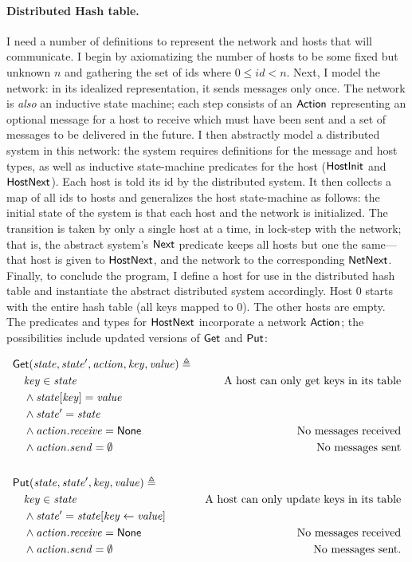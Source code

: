 \paragraph{Distributed Hash table.} I need a number of definitions to represent
the network and hosts that will communicate. I begin by axiomatizing the number
of hosts to be some fixed but unknown \(n\) and gathering the set of ids where
\(0 \le id < n\). Next, I model the network: in its idealized representation, it
sends messages only once. The network is \emph{also} an inductive state machine;
each step consists of an \(\mathsf{Action}\) representing an optional message for
a host to receive which must have been sent and a set of messages to be
delivered in the future. I then abstractly model a distributed system in this
network: the system requires definitions for the message and host types, as well
as inductive state-machine predicates for the host (\(\mathsf{HostInit}\) and
\(\mathsf{HostNext}\)). Each host is told its id by the distributed system. It
then collects a map of all ids to hosts and generalizes the host state-machine
as follows: the initial state of the system is that each host and the network is
initialized. The transition is taken by only a single host at a time, in
lock-step with the network; that is, the abstract system's \(\mathsf{Next}\)
predicate keeps all hosts but one the same---that host is given to
\(\mathsf{HostNext}\), and the network to the corresponding \(\mathsf{NetNext}\).
Finally, to conclude the program, I define a host for use in the distributed
hash table and instantiate the abstract distributed system accordingly. Host 0
starts with the entire hash table (all keys mapped to 0). The other hosts are
empty. The predicates and types for \(\mathsf{HostNext}\) incorporate a network
\(\mathsf{Action}\); the possibilities include updated versions of \(\mathsf{Get}\)
and \(\mathsf{Put}\):

\begin{align*}
    & \mathsf{Get}(\mathit{state}, \mathit{state'}, \mathit{action}, \mathit{key}, \mathit{value}) \triangleq\; \\
    & \quad \mathit{key} \in \mathit{state} & \text{A host can only get keys in its table} \\
    & \quad \land \mathit{state}[\mathit{key}] = \mathit{value} \\
    & \quad \land \mathit{state'} = \mathit{state} \\
    & \quad \land \mathit{action.receive} = \mathsf{None} & \text{No messages received} \\
    & \quad \land \mathit{action.send} = \emptyset & \text{No messages sent} \\
    \\
    & \mathsf{Put}(\mathit{state}, \mathit{state'}, \mathit{key}, \mathit{value}) \triangleq\; \\
    & \quad \mathit{key} \in \mathit{state} & \text{A host can only update keys in its table} \\
    & \quad \land \mathit{state'} = \mathit{state}[\mathit{key} \gets \mathit{value}] \\
    & \quad \land \mathit{action.receive} = \mathsf{None} & \text{No messages received} \\
    & \quad \land \mathit{action.send} = \emptyset & \text{No messages sent.}
\end{align*}

